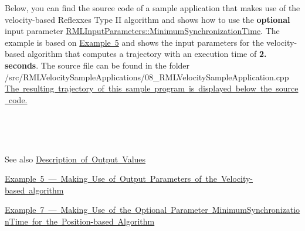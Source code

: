 Below, you can find the source code of a sample application that makes use of the velocity-\/based Reflexxes Type II algorithm and shows how to use the {\bfseries{optional}} input parameter \mbox{\hyperlink{classRMLInputParameters_a293077b01e48af1657edd8765732c836}{R\+M\+L\+Input\+Parameters\+::\+Minimum\+Synchronization\+Time}}. The example is based on \mbox{\hyperlink{page_Code_05_RMLVelocitySampleApplication}{Example 5}} and shows the input parameters for the velocity-\/based algorithm that computes a trajectory with an execution time of {\bfseries{2. seconds}}. The source file can be found in the folder~\newline
~\newline
{\ttfamily /src/\+R\+M\+L\+Velocity\+Sample\+Applications/08\+\_\+\+R\+M\+L\+Velocity\+Sample\+Application.cpp}~\newline
~\newline
\mbox{\hyperlink{page_Code_08_RMLVelocitySampleApplication_anc_VelocityExample8}{The resulting trajectory of this sample program is displayed below the source code.}} ~\newline
~\newline
 
\begin{DoxyCodeInclude}{0}
\end{DoxyCodeInclude}


~\newline
~\newline
\label{page_Code_08_RMLVelocitySampleApplication_anc_VelocityExample8}%
%
 

~\newline
~\newline
 \begin{DoxySeeAlso}{See also}
\mbox{\hyperlink{page_OutputValues}{Description of Output Values}} 

\mbox{\hyperlink{page_Code_05_RMLVelocitySampleApplication}{Example 5 --- Making Use of Output Parameters of the Velocity-\/based algorithm}} 

\mbox{\hyperlink{page_Code_07_RMLPositionSampleApplication}{Example 7 --- Making Use of the Optional Parameter Minimum\+Synchronization\+Time for the Position-\/based Algorithm}} 
\end{DoxySeeAlso}
